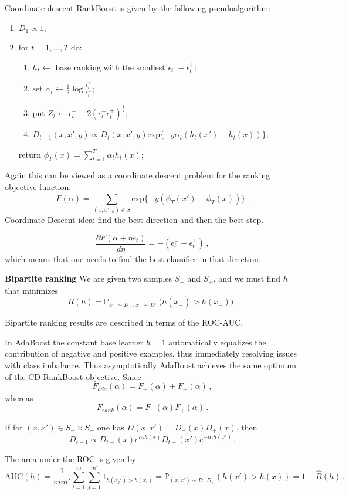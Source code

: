\documentclass[a4paper]{article}
\newcommand{\pr}{\mathbb{P}}
\begin{document}
Coordinate descent RankBoost is given by the following pseudoalgorithm:
\begin{enumerate}
    \item $D_1\propto 1$;
    \item for $t=1,\ldots, T$ do: \begin{enumerate}
        \item $h_t\leftarrow $ base ranking with the smallest $\epsilon^-_t-\epsilon^+_t$;
        \item set $\alpha_t \leftarrow \frac{1}{2}\log\frac{\epsilon^+_t}{\epsilon^-_t}$;
        \item put $Z_t \leftarrow \epsilon^-_t + 2(\epsilon^-_t\epsilon^+_t)^\frac{1}{2}$;
        \item $D_{t+1}(x,x',y) \propto D_t(x,x',y) \text{exp} \{ -y\alpha_t(h_t(x')-h_t(x)) \}$;
    \end{enumerate}
    return $\phi_T(x) = \sum_{t=1}^T \alpha_t h_t(x)$;
\end{enumerate}

Again this can be viewed as a coordinate descent problem for the ranking objective
function:
\[ F(\alpha) = \sum_{(x,x',y)\in S} \text{exp}\{-y(\phi_T(x')-\phi_T(x))\} \,. \]
Coordinate Descent idea: find the best direction and then the best step.

\[\frac{\partial F(\alpha + \eta e_t)}{d \eta}
    = -(\epsilon^-_t - \epsilon^+_t) \,,\]
which means that one needs to find the best classifier in that direction.

\textbf{Bipartite ranking} We are given two samples $S_-$ and $S_+$, and
we must find $h$ that minimizes
\[R(h) = \pr_{x_+\sim D_+\,,x_-\sim D_-} \bigl( h(x_+) > h(x_-) \bigr) \,. \]

Bipartite ranking results are described in terms of the ROC-AUC.

In AdaBoost the constant base learner $h=1$ automatically equalizes the contribution
of negative and positive examples, thus immediately resolving issues with class
imbalance. Thus asymptotically AdaBoost achieves the same optimum of the CD RankBoost
objective.
Since
\[F_{ada}(\alpha) = F_-(\alpha) + F_+(\alpha)\,,\]
whereas
\[F_{rank}(\alpha) = F_-(\alpha) F_+(\alpha)\,.\]

If for $(x,x')\in S_-\times S_+$ one has $D(x,x') = D_-(x) D_+(x)$, then
\[ D_{t+1} \propto D_{t-}(x) e^{\alpha_t h(x)} D_{t+}(x') e^{-\alpha_t h(x')}
    \,. \]

The area under the ROC is given by
\[ \text{AUC}(h)
    = \frac{1}{mm'}\sum_{i=1}^m \sum_{j=1}^{m'} 1_{h(x_j') > h(x_i)}
    = \pr_{(x,x')\sim \hat{D}_-\hat{D}_+}(h(x') > h(x))
    = 1 - \hat{R}(h)
    \,. \]
\end{document}
